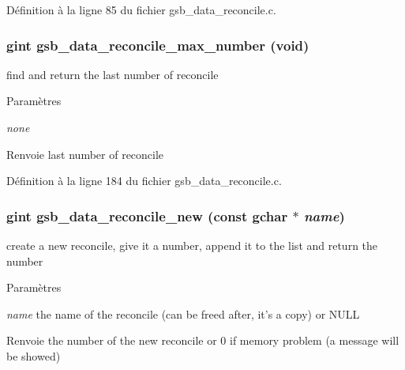 Définition à la ligne 85 du fichier gsb\_\-data\_\-reconcile.c.

\subsubsection[{gsb\_\-data\_\-reconcile\_\-max\_\-number}]{\setlength{\rightskip}{0pt plus 5cm}gint gsb\_\-data\_\-reconcile\_\-max\_\-number (void)}\label{gsb__data__reconcile_8c_a4bf21657f3550be9b9d6257c99bc2b4c}
find and return the last number of reconcile


\begin{DoxyParams}{Paramètres}
\item[{\em none}]\end{DoxyParams}
\begin{DoxyReturn}{Renvoie}
last number of reconcile 
\end{DoxyReturn}


Définition à la ligne 184 du fichier gsb\_\-data\_\-reconcile.c.

\subsubsection[{gsb\_\-data\_\-reconcile\_\-new}]{\setlength{\rightskip}{0pt plus 5cm}gint gsb\_\-data\_\-reconcile\_\-new (const gchar $\ast$ {\em name})}\label{gsb__data__reconcile_8c_a62d7a52b2bf26c55b8a6cfe835aaf91a}
create a new reconcile, give it a number, append it to the list and return the number


\begin{DoxyParams}{Paramètres}
\item[{\em name}]the name of the reconcile (can be freed after, it's a copy) or NULL\end{DoxyParams}
\begin{DoxyReturn}{Renvoie}
the number of the new reconcile or 0 if memory problem (a message will be showed) 
\end{DoxyReturn}


